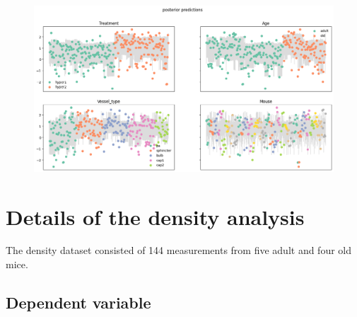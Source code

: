 \documentclass[
  letterpaper,
  DIV=11,
  numbers=noendperiod,
  oneside]{scrartcl}
\theoremstyle{plain}
\theoremstyle{remark}
\begin{document}
\begin{figure}


\caption{\label{fig-hypertension-predictions}\includegraphics{../plots/hypertension-posterior-predictive.png}}

\end{figure}%

\section{Details of the density analysis}\label{sec-density-details}

The density dataset consisted of 144 measurements from five adult and
four old mice.

\subsection{Dependent variable}\label{dependent-variable-4}
\end{document}
